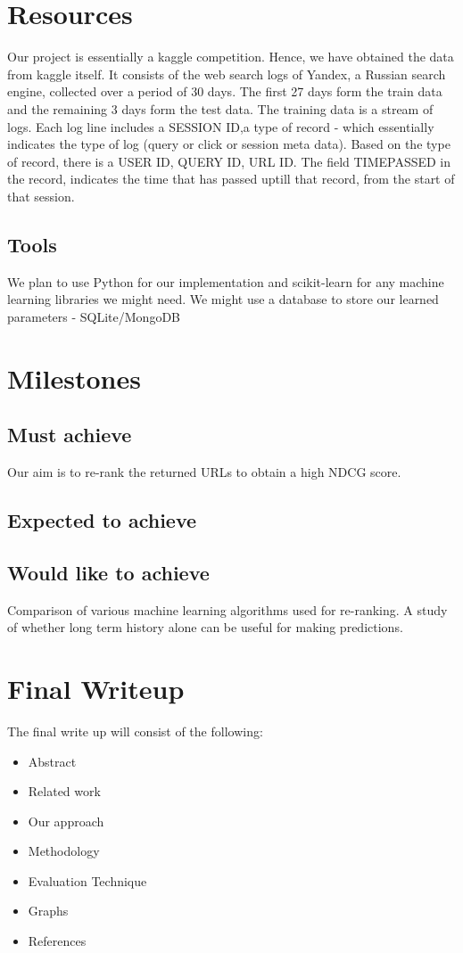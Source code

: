 \documentclass[11pt]{article}
\begin{document}
\section{Resources}
Our project is essentially a kaggle competition. Hence, we have obtained the data from kaggle itself. It consists of the web search logs of Yandex, a Russian search engine, collected over a period of 30 days. The first 27 days form the train data and the remaining 3 days form the test data. \newline
The training data is a stream of logs. Each log line includes a SESSION ID,a type of record  - which essentially indicates the type of log (query or click or session meta data). Based on the type of record, there is a USER ID, QUERY ID, URL ID. The field TIMEPASSED in the record, indicates the time that has passed uptill that record, from the start of that session. 

\subsection{Tools}
We plan to use Python for our implementation and scikit-learn for any machine learning libraries we might need. \newline
We might use a database to store our learned parameters - SQLite/MongoDB
\section{Milestones}
\subsection{Must achieve}
Our aim is to re-rank the returned URLs to obtain a high NDCG score.  
\subsection{Expected to achieve}

\subsection{Would like to achieve}
Comparison of various machine learning algorithms used for re-ranking. A study of whether long term history alone can be useful for making predictions. 

\section{Final Writeup}
The final write up will consist of the following:\newline
\begin{itemize}
\item Abstract
\item Related work
\item Our approach 
\item Methodology
\item Evaluation Technique
\item Graphs
\item References
\end{itemize}
\end{document}
